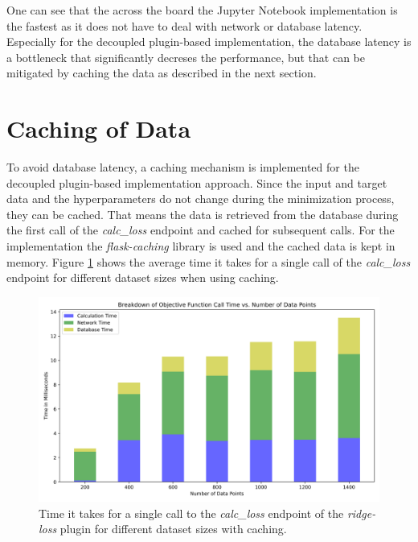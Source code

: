 \documentclass[
  a4paper,  %
  twoside,  %
  bibliography=totoc,
  headsepline,
  cleardoublepage=empty,
  parskip=half,
  draft=false
]{scrbook}
\begin{document}
One can see that the across the board the Jupyter Notebook implementation is the fastest as it does not have to deal with network or database latency.
Especially for the decoupled plugin-based implementation, the database latency is a bottleneck that significantly decreses the performance, but that can be mitigated by caching the data as described in the next section.

\section{Caching of Data}
\label{subsec:cachingOfData}

To avoid database latency, a caching mechanism is implemented for the decoupled plugin-based implementation approach.
Since the input and target data and the hyperparameters do not change during the minimization process, they can be cached.
That means the data is retrieved from the database during the first call of the \emph{calc\_loss} endpoint and cached for subsequent calls.
For the implementation the \emph{flask-caching} library is used and the cached data is kept in memory.
Figure \ref{fig:of_call_time_version1_cached} shows the average time it takes for a single call of the \emph{calc\_loss} endpoint for different dataset sizes when using caching.

\begin{figure}
  \centering
  \includegraphics[width=\textwidth]{graphics/of_call_times_version1_cached.png}
  \caption[Call time for \emph{calc\_loss} endpoint decoupled approach with caching]{Time it takes for a single call to the \emph{calc\_loss} endpoint of the \emph{ridge-loss} plugin for different dataset sizes with caching.}
  \label{fig:of_call_time_version1_cached}
\end{figure}
\end{document}
